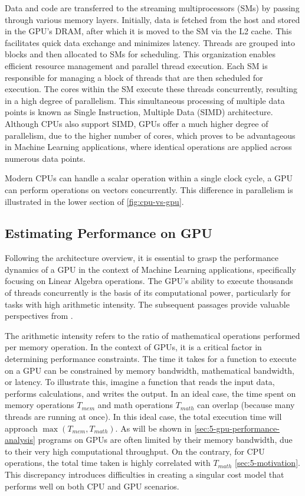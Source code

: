 Data and code are transferred to the streaming multiprocessors (SMs) by passing through various memory layers. Initially, data is fetched from the host and stored in the GPU's DRAM, after which it is moved to the SM via the L2 cache. This facilitates quick data exchange and minimizes latency. Threads are grouped into blocks and then allocated to SMs for scheduling. This organization enables efficient resource management and parallel thread execution. Each SM is responsible for managing a block of threads that are then scheduled for execution. The cores within the SM execute these threads concurrently, resulting in a high degree of parallelism. This simultaneous processing of multiple data points is known as Single Instruction, Multiple Data (SIMD) architecture. Although CPUs also support SIMD, GPUs offer a much higher degree of parallelism, due to the higher number of cores, which proves to be advantageous in Machine Learning applications, where identical operations are applied across numerous data points.

Modern CPUs can handle a scalar operation within a single clock cycle, a GPU can perform operations on vectors concurrently. This difference in parallelism is illustrated in the lower section of \autoref{fig:cpu-vs-gpu}.

\subsection{Estimating Performance on GPU}
\label{subsec:gpu-performance}
Following the architecture overview, it is essential to grasp the performance dynamics of a GPU in the context of Machine Learning applications, specifically focusing on Linear Algebra operations. The GPU's ability to execute thousands of threads concurrently is the basis of its computational power, particularly for tasks with high arithmetic intensity. The subsequent passages provide valuable perspectives from \cite{nvidia-gpu-performance:online}.

The arithmetic intensity refers to the ratio of mathematical operations performed per memory operation. In the context of GPUs, it is a critical factor in determining performance constraints. The time it takes for a function to execute on a GPU can be constrained by memory bandwidth, mathematical bandwidth, or latency. To illustrate this, imagine a function that reads the input data, performs calculations, and writes the output. In an ideal case, the time spent on memory operations $ T_{mem} $ and math operations $ T_{math} $ can overlap (because many threads are running at once). In this ideal case, the total execution time will approach $ \max(T_{mem}, T_{math})$. As will be shown in \autoref{sec:5-gpu-performance-analysis} programs on GPUs are often limited by their memory bandwidth, due to their very high computational throughput. On the contrary, for CPU operations, the total time taken is highly correlated with $T_{math}$ \autoref{sec:5-motivation}. This discrepancy introduces difficulties in creating a singular cost model that performs well on both CPU and GPU scenarios.

